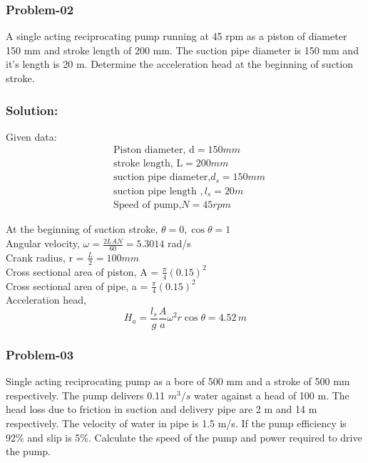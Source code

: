 \documentclass{article}
\begin{document}
\begin{multicols*}{2}
      \subsubsection*{Problem-02}
      A single acting reciprocating pump running at 45 rpm as a piston of diameter 150 mm and stroke length of 200 mm. The suction pipe diameter is 150 mm and it's length is 20 m. Determine the acceleration head at the beginning of suction stroke. 
      \subsubsection*{Solution:}
      Given data:
      \begin{align*}
        &\text{Piston diameter, d} = 150 mm \\
        &\text{stroke length, L} = 200 mm \\
        &\text{suction pipe diameter,} d_s = 150 mm \\
        &\text{suction pipe length }, l_s = 20 m \\
        &\text{Speed of pump,} N = 45 rpm 
      \end{align*}
      
      At the beginning of suction stroke, $\theta = 0,  \cos \theta = 1$ \\
      Angular velocity, $\omega = \frac{2LAN}{60} = 5.3014$ rad/s \\
      Crank radius, r = $\frac{L}{2} = 100 mm$ \\
      Cross sectional area of piston, A = $\frac{\pi}{4} (0.15)^2$ \\ 
      Cross sectional area of pipe, a = $\frac{\pi}{4} (0.15)^2$\\
      Acceleration head, $$H_a = \frac{l_s}{g} \frac{A}{a} \omega^2 r \cos \theta = 4.52 \, m $$

      \subsubsection*{Problem-03}
      Single acting reciprocating pump as a bore of 500 mm and a stroke of 500 mm respectively. The pump delivers 0.11 $m^3/s$ water against a head of 100 m. The head loss due to friction in suction and delivery pipe are 2 m  and 14 m respectively. The velocity of water in pipe is 1.5 m/s. If the pump efficiency is 92\% and slip is 5\%. Calculate the speed of the pump and power required to drive the pump. 


\end{multicols*}
\end{document}
